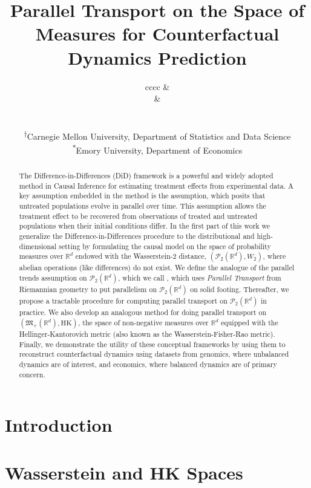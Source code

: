 \documentclass[11pt]{article}
\title{Parallel Transport on the Space of Measures for Counterfactual Dynamics Prediction}
\author{
\begin{tabular}{cccc} %
\multicolumn{2}{c}{\makecell[c]{Tristan Luca Saidi\textsuperscript{\(\dagger\)}\\ \href{mailto:tsaidi@andrew.cmu.edu}{\nolinkurl{tsaidi@andrew.cmu.edu}}}} &
\multicolumn{2}{c}{\makecell[c]{Gonzalo Mena\textsuperscript{\(\dagger\)}\\ \href{mailto:gmena@andrew.cmu.edu}{\nolinkurl{gmena@andrew.cmu.edu}}}} \\[2em]
\multicolumn{2}{c}{\makecell[c]{Larry Wasserman\textsuperscript{\(\dagger\)}\\ \href{mailto:larry@stat.cmu.edu}{\nolinkurl{larry@stat.cmu.edu}}}} &
\multicolumn{2}{c}{\makecell[c]{Florian Gunsilius\textsuperscript{\(*\)}\\ \href{mailto:florian.felix.gunsilius@emory.edu}{\nolinkurl{fgunsil@emory.edu}}}} \\[1.5em]
\end{tabular}
\small\\ %
\textsuperscript{\(\dagger\)}Carnegie Mellon University, Department of Statistics and Data Science\\
\textsuperscript{\(*\)}Emory University, Department of Economics
}
\begin{document}
\maketitle


\begin{abstract}
    The Difference-in-Differences (DiD) framework is a powerful and widely adopted method in Causal Inference for estimating treatment effects from experimental data. A key assumption embedded in the method is the  assumption, which posits that untreated populations evolve in parallel over time. This assumption allows the treatment effect to be recovered from observations of treated and untreated populations when their initial conditions differ. In the first part of this work we generalize the Difference-in-Differences procedure to the distributional and high-dimensional setting by formulating the causal model on the space of probability measures over $\mathbb{R}^d$ endowed with the Wasserstein-2 distance, $(\mathcal{P}_2(\mathbb{R}^d), W_2)$, where abelian operations (like differences) do not exist. We define the analogue of the parallel trends assumption on $\mathcal{P}_2(\mathbb{R}^d)$, which we call , which uses \textit{Parallel Transport} from Riemannian geometry to put parallelism on $\mathcal{P}_2(\mathbb{R}^d)$ on solid footing. Thereafter, we propose a tractable procedure for computing parallel transport on $\mathcal{P}_2(\mathbb{R}^d)$ in practice. We also develop an analogous  method for doing parallel transport on $(\mathfrak{M}_+(\mathbb{R}^d), \text{HK})$, the space of non-negative measures over $\mathbb{R}^d$ equipped with the Hellinger-Kantorovich metric (also known as the Wasserstein-Fisher-Rao metric). Finally, we demonstrate the utility of these conceptual frameworks by using them to reconstruct counterfactual dynamics using datasets from genomics, where unbalanced dynamics are of interest, and economics, where balanced dynamics are of primary concern. 
\end{abstract}


\section{Introduction}

\section{Wasserstein and HK Spaces}
\end{document}
